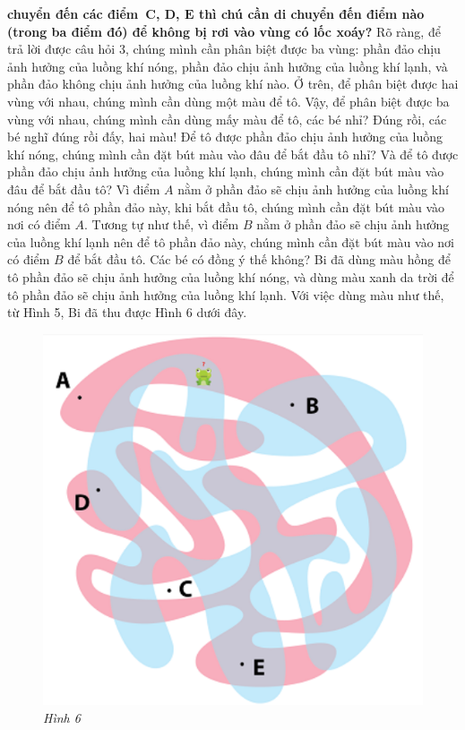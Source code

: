 	\textbf{{\color{abc}chuyển đến các điểm~$\pmb C$, $\pmb D$, $\pmb E$ thì chú cần di chuyển đến điểm nào (trong ba điểm đó) để không bị rơi vào vùng có  lốc xoáy?}}
	\vskip 0.1cm
	Rõ ràng, để trả lời được câu hỏi 3, chúng mình cần phân biệt được ba vùng: phần đảo chịu ảnh hưởng của luồng khí nóng, phần đảo chịu ảnh hưởng của luồng khí lạnh, và phần đảo không chịu ảnh hưởng của luồng khí nào.
	\vskip 0.1cm
	Ở trên, để phân biệt được hai vùng với nhau, chúng mình cần dùng một màu để tô. Vậy, để phân biệt được ba vùng với nhau, chúng mình cần dùng mấy màu để tô, các bé nhỉ? Đúng rồi, các bé nghĩ đúng rồi đấy, hai màu! Để tô được phần đảo chịu ảnh hưởng của luồng khí nóng, chúng mình cần đặt bút màu vào đâu để bắt đầu tô nhỉ? Và để tô được phần đảo chịu ảnh hưởng của luồng khí lạnh, chúng mình cần đặt bút màu vào đâu để bắt đầu tô? Vì điểm $A$ nằm ở phần đảo sẽ chịu ảnh hưởng của luồng khí nóng nên để tô phần đảo này, khi bắt đầu tô, chúng  mình cần đặt bút màu vào nơi có điểm $A$. Tương tự như thế, vì điểm $B$ nằm ở phần đảo sẽ chịu ảnh hưởng của luồng khí lạnh nên để tô phần đảo này, chúng mình cần đặt bút màu vào nơi có điểm $B$ để bắt đầu tô. Các bé có đồng ý  thế không?
	\vskip 0.05cm
	Bi đã dùng màu hồng để tô phần đảo sẽ chịu ảnh hưởng của luồng khí nóng, và dùng màu xanh da trời để tô phần đảo sẽ chịu ảnh hưởng của luồng khí lạnh. Với việc dùng màu như thế, từ Hình 5, Bi đã thu được Hình 6 dưới đây.
	\vskip 0.1cm
	\begin{figure}
		\centering
		\vspace*{-5pt}
		\captionsetup{labelformat=empty, justification=centering}
		\includegraphics[scale=0.35]{6}
		\vspace*{-10pt}
		\caption{\textit{\small Hình 6}}
		\vspace*{-10pt}
	\end{figure}
